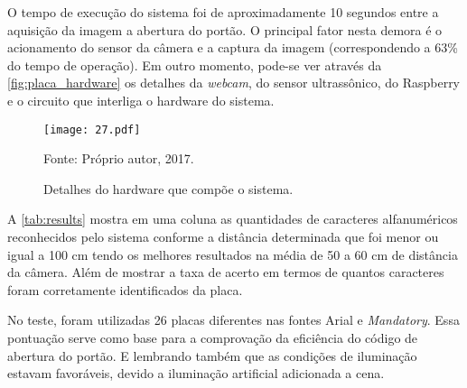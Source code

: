 O tempo de execução do sistema foi de aproximadamente 10 segundos entre a aquisição da imagem a abertura do portão. O principal fator nesta demora é o acionamento do sensor da câmera e a captura da imagem (correspondendo a 63\% do tempo de operação). Em outro momento, pode-se ver através da \autoref{fig:placa_hardware} os detalhes da \textit{webcam}, do sensor ultrassônico, do Raspberry e o circuito que interliga o hardware do sistema.

\begin{figure}[htb]
	\centering
	\caption{{\footnotesize Detalhes do hardware que compõe o sistema.}}   %
	\label{fig:placa_hardware}
	\texttt{[image: 27.pdf]}
	
	{\footnotesize Fonte: Próprio autor, 2017.}
\end{figure}

A \autoref{tab:results} mostra em uma coluna as quantidades de caracteres alfanuméricos reconhecidos pelo sistema conforme a distância determinada que foi menor ou igual a 100 cm tendo os melhores resultados na média de 50 a 60 cm de distância da câmera. Além de mostrar a taxa de acerto em termos de quantos caracteres foram corretamente identificados da placa. 

No teste, foram utilizadas 26 placas diferentes nas fontes Arial e \textit{Mandatory}. Essa pontuação serve como base para a comprovação da eficiência do código de abertura do portão. E lembrando também que as condições de iluminação estavam favoráveis, devido a iluminação artificial adicionada a cena.

